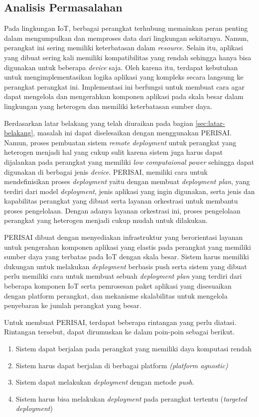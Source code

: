 \subsection{Analisis Permasalahan}
\label{sec:analisis-permasalahan}

Pada lingkungan IoT, berbagai perangkat terhubung memainkan peran penting dalam mengumpulkan dan memproses data dari lingkungan sekitarnya. Namun, perangkat ini sering memiliki keterbatasan dalam \textit{resource}. Selain itu, aplikasi yang dibuat sering kali memiliki kompatibilitas yang rendah sehingga hanya bisa digunakan untuk beberapa \textit{device} saja. Oleh karena itu, terdapat kebutuhan untuk mengimplementasikan logika aplikasi yang kompleks secara langsung ke perangkat perangkat ini. Implementasi ini berfungsi untuk membuat cara agar dapat mengelola dan mengerahkan komponen aplikasi pada skala besar dalam lingkungan yang heterogen dan memiliki keterbatasan sumber daya.

Berdasarkan latar belakang yang telah diuraikan pada bagian \ref{sec:latar-belakang}, masalah ini dapat diselesaikan dengan menggunakan PERISAI. Namun, proses pembuatan sistem \textit{remote deployment} untuk perangkat yang heterogen menjadi hal yang cukup sulit karena sistem juga harus dapat dijalankan pada perangkat yang memiliki \textit{low computaional power} sehingga dapat digunakan di berbagai jenis \textit{device}. PERISAI, memiliki cara untuk mendefinisikan proses \textit{deployment} yaitu dengan membuat \textit{deployment plan}, yang terdiri dari model \textit{deployment}, jenis aplikasi yang ingin digunakan, serta jenis dan kapabilitas perangkat yang dibuat serta layanan orkestrasi untuk membantu proses pengelolaan. Dengan adanya layanan orkestrasi ini, proses pengelolaan perangkat yang heterogen menjadi cukup mudah untuk dilakukan.

PERISAI dibuat dengan menyediakan infrastruktur yang berorientasi layanan untuk pengerahan komponen aplikasi yang elastis pada perangkat yang memiliki sumber daya yang terbatas pada IoT dengan skala besar. Sistem harus memiliki dukungan untuk melakukan \textit{deployment} berbasis push serta sistem yang dibuat perlu memiliki cara untuk membuat sebuah \textit{deployment plan} yang terdiri dari beberapa komponen IoT serta pemrosesan paket aplikasi yang disesuaikan dengan platform perangkat, dan mekanisme skalabilitas untuk mengelola penyebaran ke jumlah perangkat yang besar.

Untuk membuat PERISAI, terdapat beberapa rintangan yang perlu diatasi. Rintangan tersebut, dapat dirumuskan ke dalam poin-poin sebagai berikut.

\begin{enumerate}
  \item Sistem dapat berjalan pada perangkat yang memiliki daya komputasi rendah
  \item Sistem harus dapat berjalan di berbagai platform \textit{(platform agnostic)}
  \item Sistem dapat melakukan \textit{deployment} dengan metode \textit{push}.
  \item Sistem harus bisa melakukan \textit{deployment} pada perangkat tertentu (\textit{targeted deployment})
\end{enumerate}
